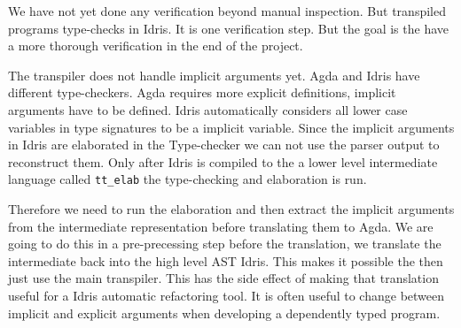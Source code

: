 \documentclass[parskip=half]{scrartcl}
\begin{document}


We have not yet done any verification beyond manual inspection.  But transpiled
programs type-checks in Idris. It is one verification step.  But the goal is
the have a more thorough verification in the end of the project.



The transpiler does not handle implicit arguments yet. Agda and Idris have
different type-checkers.
Agda requires more explicit definitions, implicit arguments have to be defined.
Idris automatically considers all lower case
variables in type signatures to be a implicit variable. Since the implicit
arguments in Idris are elaborated in the Type-checker we can not use the parser
output to reconstruct them.  Only after Idris is compiled to the a lower level intermediate
language called \texttt{tt\_elab} the type-checking and elaboration is run.

Therefore we need to run the elaboration and then extract the implicit
arguments from the intermediate representation before translating them to
Agda.  We are going to do this in a pre-precessing step before the translation,
we translate the intermediate back into the high level AST Idris. This makes it
possible the then just use the main transpiler.  This has the side effect of
making that translation useful for a Idris automatic refactoring tool. It is
often useful to change between implicit and explicit arguments when developing
a dependently typed program.

\end{document}
